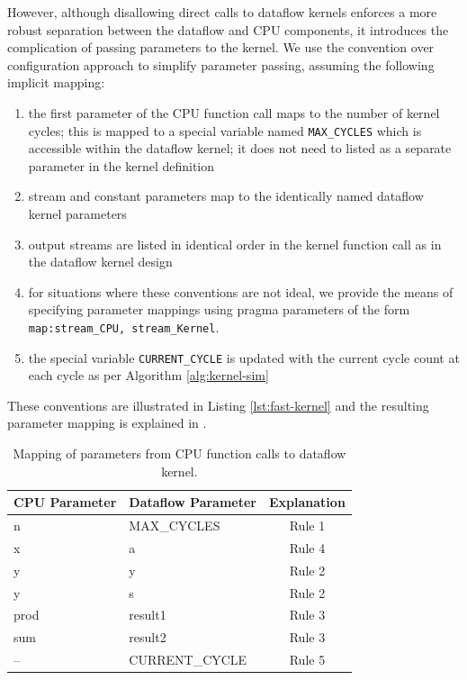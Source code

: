 However, although disallowing direct calls to \FAST{} dataflow kernels
enforces a more robust separation between the dataflow and CPU
components, it introduces the complication of passing parameters to
the kernel. We use the convention over configuration approach
\cite{chen2006convention} to simplify parameter passing, assuming the
following implicit mapping:
\begin{enumerate}
\item the first parameter of the CPU function call maps to the number
  of kernel cycles; this is mapped to a special variable named
  \texttt{MAX\_CYCLES} which is accessible within the dataflow kernel;
  it does not need to listed as a separate parameter in the kernel definition
\item stream and constant parameters map to the identically named
  dataflow kernel parameters
\item output streams are listed in identical order in the kernel
  function call as in the dataflow kernel design
\item for situations where these conventions are not ideal, we provide
  the means of specifying parameter mappings using pragma parameters
  of the form \texttt{map:stream\_CPU, stream\_Kernel}.
\item the special variable \texttt{CURRENT\_CYCLE} is updated with the
  current cycle count at each cycle as per Algorithm \ref{alg:kernel-sim}
\end{enumerate}

These conventions are illustrated in Listing \ref{lst:fast-kernel} and
the resulting parameter mapping is explained in
.

\begin{table}[!ht]
\begin{tabularx}{\textwidth}{X|X|c}
  \textbf{CPU Parameter} & \textbf{Dataflow Parameter} & \textbf{Explanation} \\
\hline
\hline
  n & MAX\_CYCLES & Rule 1 \\
  x &  a & Rule 4 \\
  y & y & Rule 2 \\
  y & s & Rule 2 \\
  prod & result1 & Rule 3 \\
  sum  & result2 & Rule 3 \\
  -- & CURRENT\_CYCLE & Rule 5
\end{tabularx}
\caption{Mapping of parameters from CPU function calls to \FAST{} dataflow kernel.}
\label{table:fast-params}
\end{table}

